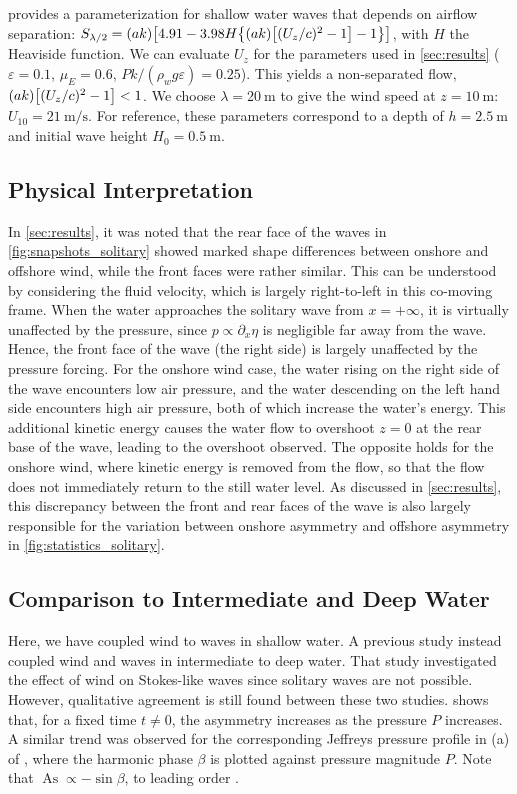 \documentclass{jfm}
\DeclareMathOperator{\As}{As}
\renewcommand*{\epsilon}{\varepsilon}
\begin{document}
 provides a parameterization for shallow water
waves that depends on airflow separation: $S_{\lambda/2} =
(ak)\bqty{4.91-3.98 H\Bqty{(ak)\bqty{(U_z/c)^2-1} - 1}}$, with $H$ the
Heaviside function.
We can evaluate $U_z$ for the parameters used in \cref{sec:results}
($\epsilon=0.1$, $\mu_E = 0.6$, $Pk/(\rho_w g \epsilon) = 0.25$).
This yields a non-separated flow, $(ak)\bqty{(U_z/c)^2-1} < 1$.
We choose $\lambda = \SI{20}{\meter}$ to give the wind speed at
$z=\SI{10}{\meter}$: $U_{10} = \SI{21}{\meter\per\second}$.
For reference, these parameters correspond to a depth of $h =
\SI{2.5}{\meter}$ and initial wave height $H_0 = \SI{0.5}{\meter}$.

\subsection{Physical Interpretation}
In \cref{sec:results}, it was noted that the rear face of the waves in
\cref{fig:snapshots_solitary} showed marked shape differences between
onshore and offshore wind, while the front faces were rather similar.
This can be understood by considering the fluid velocity, which is
largely right-to-left in this co-moving frame.
When the water approaches the solitary wave from $x = +\infty$, it is
virtually unaffected by the pressure, since $p \propto \partial_x \eta$
is negligible far away from the wave.
Hence, the front face of the wave (the right side) is largely unaffected
by the pressure forcing.
For the onshore wind case, the water rising on the right side of the
wave encounters low air pressure, and the water descending on the left
hand side encounters high air pressure, both of which increase the
water's energy.
This additional kinetic energy causes the water flow to overshoot $z=0$
at the rear base of the wave, leading to the overshoot observed.
The opposite holds for the onshore wind, where kinetic energy is removed
from the flow, so that the flow does not immediately return to the still
water level.
As discussed in \cref{sec:results}, this discrepancy between the front
and rear faces of the wave is also largely responsible for the variation
between onshore asymmetry and offshore asymmetry in
\cref{fig:statistics_solitary}.

\subsection{Comparison to Intermediate and Deep Water}
Here, we have coupled wind to waves in shallow water.
A previous study \citep{zdyrski2020wind} instead coupled wind and waves
in intermediate to deep water.
That study investigated the effect of wind on Stokes-like waves since
solitary waves are not possible.
However, qualitative agreement is still found between these two studies.
 shows that, for a fixed time $t \neq 0$,
the asymmetry increases as the pressure $P$ increases.
A similar trend was observed for the corresponding Jeffreys pressure
profile in (a) of \citet{zdyrski2020wind}, where the
harmonic phase $\beta$ is plotted against pressure magnitude $P$.
Note that $\As \propto -\sin{\beta}$, to leading order \citep[\cf
eq.\ 3.55 of][]{zdyrski2020wind}.
\end{document}
